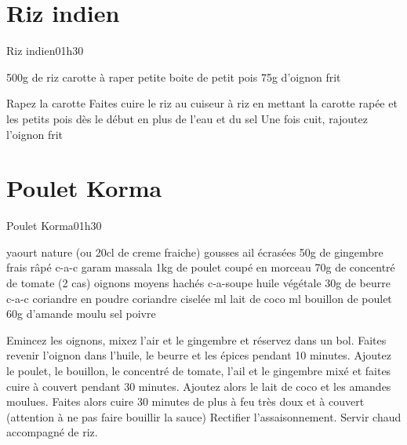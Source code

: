 {\section{Riz indien}
\begin{recette}{Riz indien}{0}{1h30}{}
\begin{ingredients}
\ingredient 500g de riz
 carotte à raper
\ingredient petite boite de petit pois
\ingredient 75g d'oignon frit
\end{ingredients}

\begin{preparation}
\etape Rapez la carotte
\etape Faites cuire le riz au cuiseur à riz en mettant la carotte rapée et les petits pois dès le début en plus de l'eau et du sel
\etape Une fois cuit, rajoutez l'oignon frit
\end{preparation}
\end{recette}

\section{Poulet Korma}
\begin{recette}{Poulet Korma}{0}{1h30}{}
\begin{ingredients}
 yaourt nature (ou 20cl de creme fraiche) %
 gousses ail écrasées
\ingredient 50g de gingembre frais râpé %
 c-a-c garam massala %
\ingredient 1kg de poulet coupé en morceau
\ingredient 70g de concentré de tomate (2 cas)
 oignons moyens hachés
 c-a-soupe huile végétale
\ingredient 30g de beurre
 c-a-c coriandre en poudre
\ingredient coriandre ciselée
 ml lait de coco
 ml bouillon de poulet
\ingredient 60g d'amande moulu
\ingredient sel
\ingredient poivre
\end{ingredients}

\begin{preparation}
\etape Emincez les oignons, mixez l'air et le gingembre et réservez dans un bol.
\etape Faites revenir l'oignon dans l'huile, le beurre et les épices pendant 10 minutes. 
\etape Ajoutez le poulet, le bouillon, le concentré de tomate, l'ail et le gingembre mixé et faites cuire à couvert pendant 30 minutes.
\etape Ajoutez alors le lait de coco et les amandes moulues. Faites alors cuire 30 minutes de plus à feu très doux et à couvert (attention à ne pas faire bouillir la sauce) Rectifier l'assaisonnement.
\etape Servir chaud accompagné de riz.
\end{preparation}
\end{recette}

}
